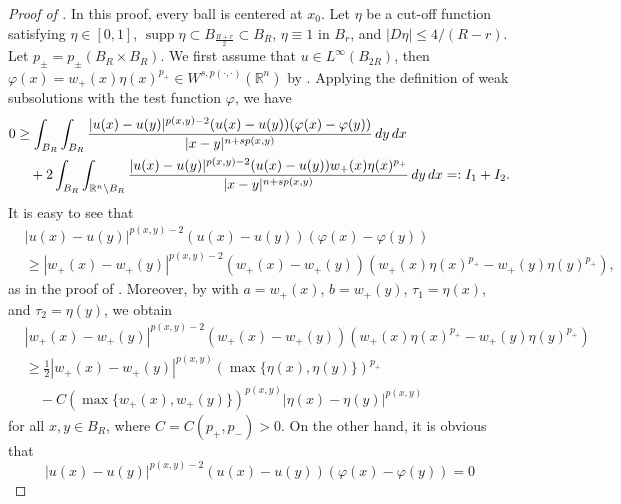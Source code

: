 \documentclass[11pt]{amsart}
\theoremstyle{plain}
\theoremstyle{definition}
\numberwithin{equation}{section}
\renewcommand{\d}{\textnormal{d}}
\DeclareMathOperator{\supp}{supp}
\begin{document}
\begin{proof} [Proof of ]
In this proof, every ball is centered at $x_0$. Let $\eta$ be a cut-off function satisfying $\eta \in [0,1]$, $\supp \eta \subset B_{\frac{R+r}{2}} \subset B_R$, $\eta \equiv 1$ in $B_r$, and $|D\eta| \leq 4/(R-r)$. Let $p_\pm = p_\pm(B_R \times B_R)$. We first assume that $u \in L^{\infty}(B_{2R})$, then $\varphi(x) = w_+(x)\eta(x)^{p_+} \in W^{s,p(\cdot, \cdot)}(\mathbb{R}^n)$ by \cite[Lemma 4.1]{Ok21}. Applying the definition of weak subsolutions with the test function $\varphi$, we have
\begin{equation} \label{eq:I_1+I_2}
\begin{split}
0
&\geq \int_{B_R} \int_{B_R} \frac{|u(x)-u(y)|^{p(x,y)-2}(u(x)-u(y))(\varphi(x) - \varphi(y))}{|x-y|^{n+sp(x,y)}} \,\d y \,\d x \\
&\quad + 2 \int_{B_R} \int_{\mathbb{R}^n \setminus B_R} \frac{|u(x)-u(y)|^{p(x,y)-2}(u(x)-u(y)) w_+(x)\eta(x)^{p_+}}{|x-y|^{n+sp(x,y)}} \,\d y \, \d x =: I_1 + I_2.
\end{split}
\end{equation}
It is easy to see that
\begin{equation} \label{eq:I_1_1}
\begin{split}
&|u(x)-u(y)|^{p(x,y)-2}(u(x)-u(y))(\varphi(x) - \varphi(y)) \\
&\geq |w_+(x)-w_+(y)|^{p(x,y)-2}(w_+(x)-w_+(y))(w_+(x)\eta(x)^{p_+} - w_+(y) \eta(y)^{p_+}),
\end{split}
\end{equation}
as in the proof of \cite[Lemma 1.4]{DCKP16}. Moreover, by  with $a=w_+(x)$, $b=w_+(y)$, $\tau_1=\eta(x)$, and $\tau_2=\eta(y)$, we obtain
\begin{equation} \label{eq:I_1_2}
\begin{split}
&|w_+(x)-w_+(y)|^{p(x,y)-2}(w_+(x)-w_+(y))(w_+(x)\eta(x)^{p_+} - w_+(y) \eta(y)^{p_+}) \\
&\geq \frac{1}{2}|w_+(x)-w_+(y)|^{p(x,y)} (\max\lbrace \eta(x), \eta(y) \rbrace)^{p_+} \\
&\quad - C(\max\lbrace w_+(x), w_+(y) \rbrace)^{p(x,y)} |\eta(x)-\eta(y)|^{p(x,y)}
\end{split}
\end{equation}
for all $x, y \in B_R$, where $C = C(p_+, p_-)>0$. On the other hand, it is obvious that
\begin{equation} \label{eq:I_1_3}
|u(x)-u(y)|^{p(x,y)-2}(u(x)-u(y))(\varphi(x) - \varphi(y)) = 0
\end{equation}

\end{proof}
\end{document}
